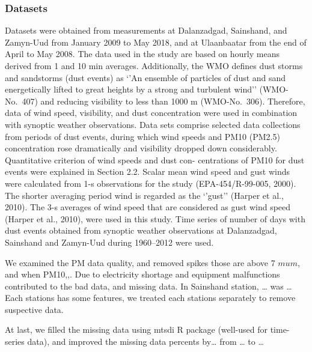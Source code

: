 \documentclass[
  number]{elsarticle}
\begin{document}
\subsubsection{Datasets}\label{datasets}

Datasets were obtained from measurements at Dalanzadgad, Sainshand, and
Zamyn-Uud from January 2009 to May 2018, and at Ulaanbaatar from the end
of April to May 2008. The data used in the study are based on hourly
means derived from 1 and 10 min averages. Additionally, the WMO defines
dust storms and sandstorms (dust events) as `'An ensemble of particles
of dust and sand energetically lifted to great heights by a strong and
turbulent wind'' (WMO-No.~407) and reducing visibility to less than 1000
m (WMO-No.~306). Therefore, data of wind speed, visibility, and dust
concentration were used in combination with synoptic weather
observations. Data sets comprise selected data collections from periods
of dust events, during which wind speeds and PM10 (PM2.5) concentration
rose dramatically and visibility dropped down considerably. Quantitative
criterion of wind speeds and dust con- centrations of PM10 for dust
events were explained in Section 2.2. Scalar mean wind speed and gust
winds were calculated from 1-s observations for the study
(EPA-454/R-99-005, 2000). The shorter averaging period wind is regarded
as the `'gust'' (Harper et al., 2010). The 3-s averages of wind speed
that are considered as gust wind speed (Harper et al., 2010), were used
in this study. Time series of number of days with dust events obtained
from synoptic weather observations at Dalanzadgad, Sainshand and
Zamyn-Uud during 1960--2012 were used.

We examined the PM data quality, and removed spikes those are above 7
\(mu m\), and when PM10,,. Due to electricity shortage and equipment
malfunctions contributed to the bad data, and missing data. In Sainshand
station, \ldots{} was \ldots{} Each stations has some features, we
treated each stations separately to remove suspective data.

At last, we filled the missing data using mtsdi R package (well-used for
time-series data), and improved the missing data percents by\ldots{}
from \ldots{} to \ldots{}
\end{document}
